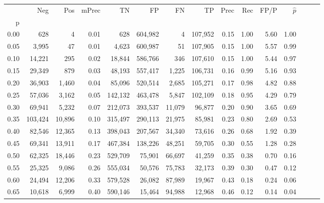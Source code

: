 \begin{tabular}{rrrrrrrrrrrrrrr}
\toprule
{} &      Neg &     Pos & mPrec &       TN &       FP &       FN &       TP &  Prec &   Rec &  FP/P & $\hat{p}$ \\
p    &          &         &       &          &          &          &          &       &       &       &           \\
\midrule
0.00 &      628 &       4 &  0.01 &      628 &  604,982 &        4 &  107,952 &  0.15 &  1.00 &  5.60 &      1.00 \\
0.05 &    3,995 &      47 &  0.01 &    4,623 &  600,987 &       51 &  107,905 &  0.15 &  1.00 &  5.57 &      0.99 \\
0.10 &   14,221 &     295 &  0.02 &   18,844 &  586,766 &      346 &  107,610 &  0.15 &  1.00 &  5.44 &      0.97 \\
0.15 &   29,349 &     879 &  0.03 &   48,193 &  557,417 &    1,225 &  106,731 &  0.16 &  0.99 &  5.16 &      0.93 \\
0.20 &   36,903 &   1,460 &  0.04 &   85,096 &  520,514 &    2,685 &  105,271 &  0.17 &  0.98 &  4.82 &      0.88 \\
0.25 &   57,036 &   3,162 &  0.05 &  142,132 &  463,478 &    5,847 &  102,109 &  0.18 &  0.95 &  4.29 &      0.79 \\
0.30 &   69,941 &   5,232 &  0.07 &  212,073 &  393,537 &   11,079 &   96,877 &  0.20 &  0.90 &  3.65 &      0.69 \\
0.35 &  103,424 &  10,896 &  0.10 &  315,497 &  290,113 &   21,975 &   85,981 &  0.23 &  0.80 &  2.69 &      0.53 \\
0.40 &   82,546 &  12,365 &  0.13 &  398,043 &  207,567 &   34,340 &   73,616 &  0.26 &  0.68 &  1.92 &      0.39 \\
0.45 &   69,341 &  13,911 &  0.17 &  467,384 &  138,226 &   48,251 &   59,705 &  0.30 &  0.55 &  1.28 &      0.28 \\
0.50 &   62,325 &  18,446 &  0.23 &  529,709 &   75,901 &   66,697 &   41,259 &  0.35 &  0.38 &  0.70 &      0.16 \\
0.55 &   25,325 &   9,086 &  0.26 &  555,034 &   50,576 &   75,783 &   32,173 &  0.39 &  0.30 &  0.47 &      0.12 \\
0.60 &   24,494 &  12,206 &  0.33 &  579,528 &   26,082 &   87,989 &   19,967 &  0.43 &  0.18 &  0.24 &      0.06 \\
0.65 &   10,618 &   6,999 &  0.40 &  590,146 &   15,464 &   94,988 &   12,968 &  0.46 &  0.12 &  0.14 &      0.04 \\

\end{tabular}
